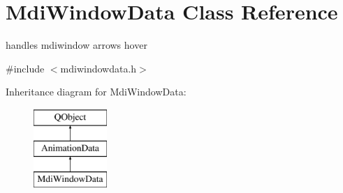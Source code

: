 \hypertarget{class_mdi_window_data}{}\section{Mdi\+Window\+Data Class Reference}
\label{class_mdi_window_data}


handles mdiwindow arrows hover  




{\ttfamily \#include $<$mdiwindowdata.\+h$>$}

Inheritance diagram for Mdi\+Window\+Data\+:\begin{figure}[H]
\begin{center}
\leavevmode
\includegraphics[height=3.000000cm]{class_mdi_window_data}
\end{center}
\end{figure}
